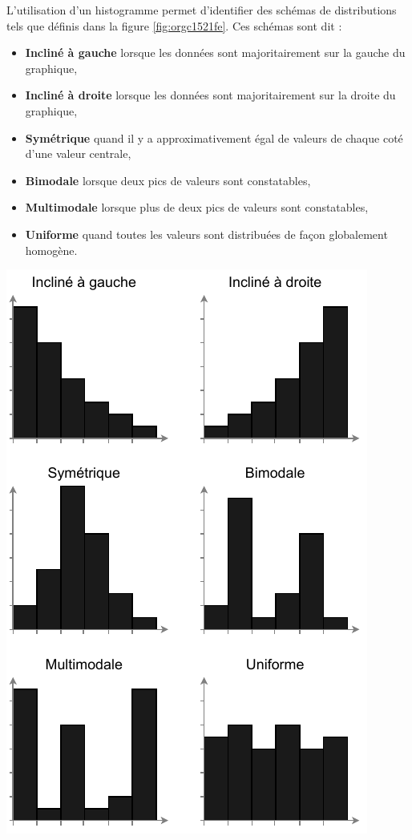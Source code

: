 \documentclass[a4paper,12pt]{article}
\begin{document}
\begin{multicols}{2}
L'utilisation d'un histogramme permet d'identifier des schémas de distributions tels que définis dans la figure \ref{fig:orgc1521fe}. \autocite{jonathanschwabishDistribution2021}
Ces schémas sont dit :
\begin{itemize}
\item \textbf{Incliné à gauche} lorsque les données sont majoritairement sur la gauche du graphique,
\item \textbf{Incliné à droite} lorsque les données sont majoritairement sur la droite du graphique,
\item \textbf{Symétrique} quand il y a approximativement égal de valeurs de chaque coté d'une valeur centrale,
\item \textbf{Bimodale} lorsque deux pics de valeurs sont constatables,
\item \textbf{Multimodale} lorsque plus de deux pics de valeurs sont constatables,
\item \textbf{Uniforme} quand toutes les valeurs sont distribuées de façon globalement homogène.
\end{itemize}

\begin{center}
\includegraphics[width=.9\linewidth]{./img/histogram-patterns.pdf}
\end{center}


\end{multicols}
\end{document}
